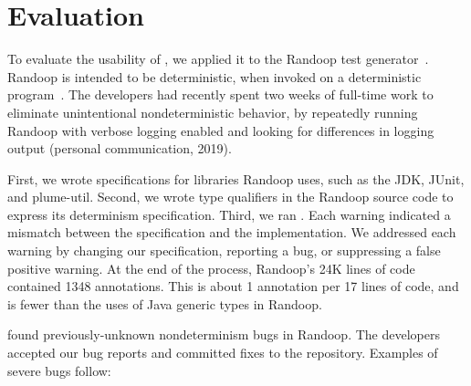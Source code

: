 \section{Evaluation\label{sec:results}}
To evaluate the usability of \theDeterminismChecker,
we applied it to the Randoop test
generator~\cite{PachecoLEB2007}.
Randoop is intended to be deterministic, when invoked on a deterministic
program~\cite{randoop-manual}.
The developers had recently
spent two weeks of full-time work to
eliminate unintentional nondeterministic behavior, by repeatedly
running Randoop with verbose logging enabled and
looking for differences in logging output (personal communication, 2019).

First, we wrote specifications for libraries Randoop uses, such as the JDK,
JUnit, and plume-util.
Second, we wrote type qualifiers in the Randoop source code to express its
determinism specification.
Third, we ran
\theDeterminismChecker.  Each warning indicated a mismatch between the
specification and the implementation.  We addressed each warning by changing our
specification, reporting a bug, or suppressing a false positive warning.
At the end of the process, Randoop's 24K lines of code contained 1348 annotations.
This is about 1 annotation per 17 lines of code,
and is fewer than the uses
of Java generic types in Randoop.

\TheDeterminismChecker found \numRandoopBugs previously-unknown
nondeterminism bugs in Randoop.
The developers accepted our bug reports and committed fixes to the repository. 
Examples
of severe bugs follow:

